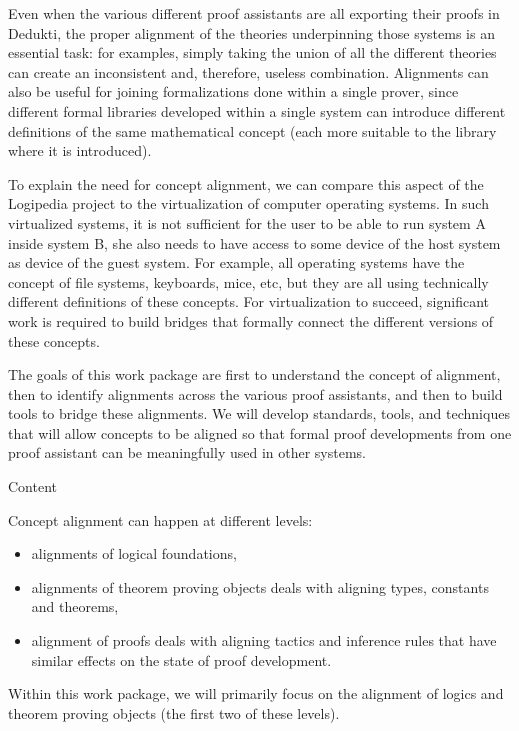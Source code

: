 Even when the various different proof assistants are all exporting their
proofs in Dedukti, the proper alignment of the theories underpinning
those systems is an essential task: for examples, simply taking the
union of all the different theories can create an inconsistent and,
therefore, useless combination.
%
Alignments can also be useful for joining formalizations done within a
single prover, since different formal libraries developed within a
single system can introduce different definitions of the same
mathematical concept (each more suitable to the library where it is
introduced).

To explain the need for concept alignment, we can compare this aspect
of the Logipedia project to the virtualization of computer operating
systems. In such virtualized systems, it is not sufficient for the
user to be able to run system A inside system B, she also needs to
have access to some device of the host system as device of the guest
system. For example, all operating systems have the concept of file
systems, keyboards, mice, etc, but they are all using technically
different definitions of these concepts.  For virtualization to
succeed, significant work is required to build bridges that formally
connect the different versions of these concepts.

The goals of this work package are first to understand the concept of
alignment, then to identify alignments across the various proof
assistants, and then to build tools to bridge these alignments. We
will develop standards, tools, and techniques that will allow concepts
to be aligned so that formal proof developments from one proof
assistant can be meaningfully used in other systems.

{\color{red} Content}

Concept alignment can happen at different levels:
\begin{itemize}
\item alignments of logical foundations,
\item alignments of theorem proving objects deals with aligning types,
  constants and theorems,
\item alignment of proofs deals with aligning tactics and
  inference rules that have similar effects on the state of proof
  development.
\end{itemize}
Within this work package, we will primarily focus on the alignment of
logics and theorem proving objects (the first two of these levels).

\newcommand{\parag}[1]{\medskip \noindent {\bf #1}} 

